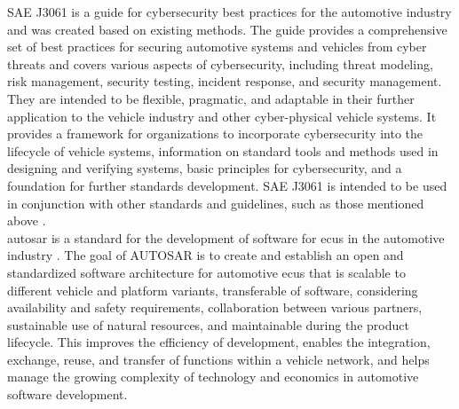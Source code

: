 SAE J3061 is a guide for cybersecurity best practices for the automotive industry and was created based on existing methods. 
The guide provides a comprehensive set of best practices for securing automotive systems and vehicles from cyber threats and covers various aspects of cybersecurity, including threat modeling, risk management, security testing, incident response, and security management.
They are intended to be flexible, pragmatic, and adaptable in their further application to the vehicle industry and other cyber-physical vehicle systems. 
It provides a framework for organizations to incorporate cybersecurity into the lifecycle of vehicle systems, information on standard tools and methods used in designing and verifying systems, basic principles for cybersecurity, and a foundation for further standards development. 
SAE J3061 is intended to be used in conjunction with other standards and guidelines, such as those mentioned above \cite{sae_j3061}.\\

\acrshort{autosar} is a standard for the development of software for \acrshort{ecu}s in the automotive industry \cite{autosar}.
The goal of AUTOSAR is to create and establish an open and standardized software architecture for automotive \acrshort{ecu}s that is scalable to different vehicle and platform variants, 
transferable of software, considering availability and safety requirements, collaboration between various partners, sustainable use of natural resources, 
and maintainable during the product lifecycle. 
This improves the efficiency of development, enables the integration, exchange, reuse, and transfer of functions within a vehicle network, 
and helps manage the growing complexity of technology and economics in automotive software development.\\

